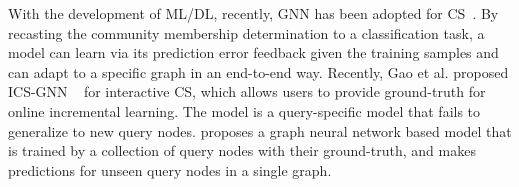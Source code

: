 With the development of ML/DL, recently, GNN has been adopted for
CS~\cite{ICSGNN}.  By recasting the community membership determination
to a classification task, a model can learn via its prediction error
feedback given the training samples and can adapt to a specific graph
in an end-to-end way.  Recently, Gao et al. proposed ICS-GNN
~\cite{ICSGNN} for interactive CS, which allows users to provide
ground-truth for online incremental learning.  The model is a
query-specific model that fails to generalize to new query nodes.  
%
\cite{AQDGNN} proposes a graph neural network based model that is
trained by a collection of query nodes with their ground-truth, and
makes predictions for unseen query nodes in a single graph.
%
%

